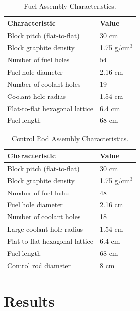 \documentclass[11pt,letterpaper]{article}
\begin{document}
	\begin{table}[htbp!]
		\centering
	    \caption{Fuel Assembly Characteristics.}
	    \label{tab:fuel}
		\begin{tabular}{l|l}
		\hline
		Characteristic                   & Value         \\ \hline
		Block pitch (flat-to-flat)       & 30 cm         \\
		Block graphite density           & 1.75 g/cm$^3$ \\
		Number of fuel holes             & 54            \\
		Fuel hole diameter               & 2.16 cm       \\
		Number of coolant holes          & 19            \\
		Coolant hole radius        		 & 1.54 cm       \\
		Flat-to-flat hexagonal lattice   & 6.4 cm        \\
		Fuel length                      & 68 cm         \\ \hline
		\end{tabular}
	\end{table}

	\begin{table}[htbp!]
		\centering
	    \caption{Control Rod Assembly Characteristics.}
	    \label{tab:control}
		\begin{tabular}{l|l}
		\hline
		Characteristic                   & Value         \\ \hline
		Block pitch (flat-to-flat)       & 30 cm         \\
		Block graphite density           & 1.75 g/cm$^3$ \\
		Number of fuel holes             & 48            \\
		Fuel hole diameter               & 2.16 cm       \\
		Number of coolant holes          & 18            \\
		Large coolant hole radius        & 1.54 cm       \\
		Flat-to-flat hexagonal lattice   & 6.4 cm        \\
		Fuel length                      & 68 cm         \\ 
		Control rod diameter             & 8 cm          \\ \hline
		\end{tabular}
	\end{table}

\section{Results}
\end{document}

